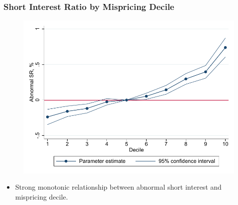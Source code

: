 \documentclass{beamer}
\begin{document}
\begin{frame}
	\frametitle{Short Interest Ratio by Mispricing Decile}
	\begin{figure}[htbp]
		\centering
		\includegraphics[scale=0.7,trim=4 4 4 4,clip]{figures/misp_sr_by_decile_fe.pdf} 
		\label{tab:misp_evolution_profitability_yq_sentiment}%
	\end{figure}
\vspace*{-0.4cm}
	\begin{itemize}
		\item Strong monotonic relationship between abnormal short interest and mispricing decile.
	\end{itemize}
\end{frame}  
%
%
%	 	
%
%
\end{document}
